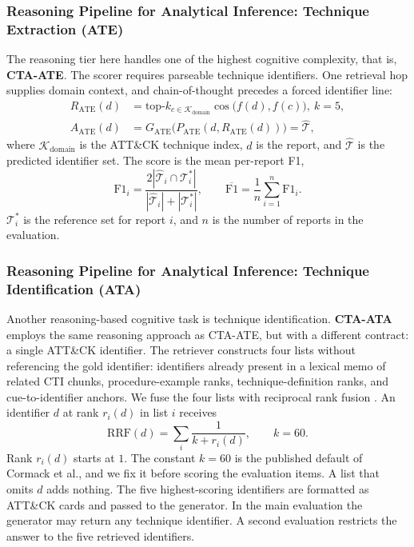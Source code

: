 \documentclass[5p,times,authoryear]{elsarticle}
\begin{document}
\subsubsection{Reasoning Pipeline for Analytical Inference: Technique Extraction (ATE)}
The reasoning tier here handles one of the highest cognitive complexity, that is, \textbf{CTA-ATE}. The scorer requires parseable technique identifiers. One retrieval hop supplies domain context, and chain-of-thought \citep{wei2022chain} precedes a forced identifier line:
\begin{align}
R_{\mathrm{ATE}}(d)&=\mathrm{top}\text{-}k_{c\in\mathcal{K}_{\mathrm{domain}}}\cos\!\bigl(f(d),f(c)\bigr),\ k{=}5,\label{eq:rate}\\
A_{\mathrm{ATE}}(d)&=G_{\mathrm{ATE}}\!\bigl(P_{\mathrm{ATE}}(d,R_{\mathrm{ATE}}(d))\bigr)=\widehat{\mathcal{T}},\label{eq:aate}
\end{align}
where $\mathcal{K}_{\mathrm{domain}}$ is the ATT\&CK technique index, $d$ is the report, and $\widehat{\mathcal{T}}$ is the predicted identifier set. The score is the mean per-report F1,
\begin{equation}
\mathrm{F1}_i=\frac{2|\widehat{\mathcal{T}}_i\cap\mathcal{T}_i^\ast|}{|\widehat{\mathcal{T}}_i|+|\mathcal{T}_i^\ast|},
\qquad
\overline{\mathrm{F1}}=\frac{1}{n}\sum_{i=1}^{n}\mathrm{F1}_i.
\label{eq:ate-f1}
\end{equation}
$\mathcal{T}_i^\ast$ is the reference set for report $i$, and $n$ is the number of reports in the evaluation.

\subsubsection{Reasoning Pipeline for Analytical Inference: Technique Identification (ATA)}

Another reasoning-based cognitive task is technique identification. \textbf{CTA-ATA} employs the same reasoning approach as CTA-ATE, but with a different contract: a single ATT\&CK identifier. The retriever constructs four lists without referencing the gold identifier: identifiers already present in a lexical memo of related CTI chunks, procedure-example ranks, technique-definition ranks, and cue-to-identifier anchors. We fuse the four lists with reciprocal rank fusion \citep{cormack2009rrf}. An identifier $d$ at rank $r_i(d)$ in list $i$ receives
\begin{equation}
\mathrm{RRF}(d)=\sum_{i}\frac{1}{k+r_i(d)},
\qquad k{=}60.
\label{eq:rrf}
\end{equation}
Rank $r_i(d)$ starts at $1$. The constant $k{=}60$ is the published default of Cormack et al., and we fix it before scoring the evaluation items. A list that omits $d$ adds nothing. The five highest-scoring identifiers are formatted as ATT\&CK cards and passed to the generator. In the main evaluation the generator may return any technique identifier. A second evaluation restricts the answer to the five retrieved identifiers.
\end{document}
